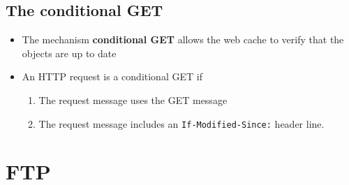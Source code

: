 \documentclass[11pt]{article}
\providecommand{\tightlist}{%
      \setlength{\itemsep}{0pt}\setlength{\parskip}{0pt}}
\begin{document}
    \subsection{The conditional GET}\label{the-conditional-get}

\begin{itemize}
\tightlist
\item
  The mechanism \textbf{conditional GET} allows the web cache to verify
  that the objects are up to date
\item
  An HTTP request is a conditional GET if

  \begin{enumerate}
  \def\labelenumi{\arabic{enumi}.}
  \tightlist
  \item
    The request message uses the GET message
  \item
    The request message includes an \texttt{If-Modified-Since:} header
    line.
  \end{enumerate}
\end{itemize}

    \section{FTP}\label{ftp}
\end{document}
